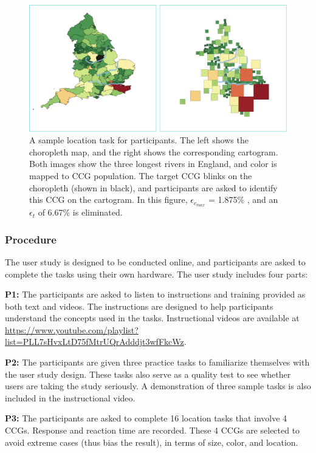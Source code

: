 \documentclass[Afour,sagev,times]{sagej}
\newcommand{\nodeError}{\epsilon}
\newcommand{\nodeCartographicErrorMax}{\nodeError_{c_{max}}}
\newcommand{\nodeTopologicalError}{\nodeError_{t}}
\begin{document}
    {
        \begin{figure}[tb!]
            \centering
            \includegraphics[width=\columnwidth,keepaspectratio]{task.png}
            \caption{A sample location task for participants. The left shows the choropleth map, and the right shows the corresponding cartogram. Both images show the three longest rivers in England, and color is mapped to CCG population. The target CCG blinks on the choropleth (shown in black), and participants are asked to identify this CCG on the cartogram. In this figure, $ \nodeCartographicErrorMax $ = 1.875\% , and an $ \nodeTopologicalError $ of 6.67\% is eliminated. }
            \label{fig:task}
        \end{figure}
    }

\subsubsection{Procedure}
\label{subsec:{Procedure}}

The user study is designed to be conducted online, and participants are asked to complete the tasks using their own hardware. The user study includes four parts:

\textbf{P1:} The participants are asked to listen to instructions and training provided as both text and videos. The instructions are designed to help participants understand the concepts used in the tasks. Instructional videos are available at \url{https://www.youtube.com/playlist?list=PLL7sHvxLtD75fMtrUQrAdddjt3wfFkcWz}.

\textbf{P2:} The participants are given three practice tasks to familiarize themselves with the user study design. These tasks also serve as a quality test to see whether users are taking the study seriously. A demonstration of three sample tasks is also included in the instructional video.

\textbf{P3:} The participants are asked to complete 16 location tasks that involve 4 CCGs. Response and reaction time are recorded. These 4 CCGs are selected to avoid extreme cases (thus bias the result), in terms of size, color, and location.
\end{document}
